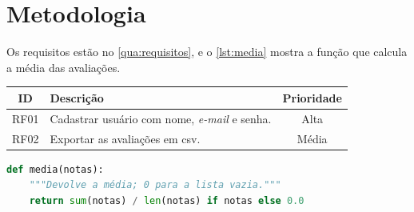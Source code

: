 \chapter{Metodologia}\label{cap:metodologia}

Os requisitos estão no \autoref{qua:requisitos}, e o \autoref{lst:media}
mostra a função que calcula a média das avaliações.

\begin{quadro}[htbp]
\begin{ilustracao}[\linewidth]{\caption{Requisitos funcionais do protótipo}%
                               \label{qua:requisitos}}%
                              {\elaboracaopropria}
  \renewcommand{\arraystretch}{1.25}
  \begin{tabularx}{\linewidth}{|c|X|c|}
    \hline
    \textbf{ID} & \textbf{Descrição} & \textbf{Prioridade} \\
    \hline
    RF01 & Cadastrar usuário com nome, \emph{e-mail} e senha. & Alta \\
    \hline
    RF02 & Exportar as avaliações em \acs{csv}. & Média \\
    \hline
  \end{tabularx}
\end{ilustracao}
\end{quadro}

\begin{codigo}[htbp]
\begin{ilustracao}[\linewidth]{\caption{Média das avaliações}\label{lst:media}}%
                              {\elaboracaopropria}
\begin{lstlisting}[language=Python]
def media(notas):
    """Devolve a média; 0 para a lista vazia."""
    return sum(notas) / len(notas) if notas else 0.0
\end{lstlisting}
\end{ilustracao}
\end{codigo}
